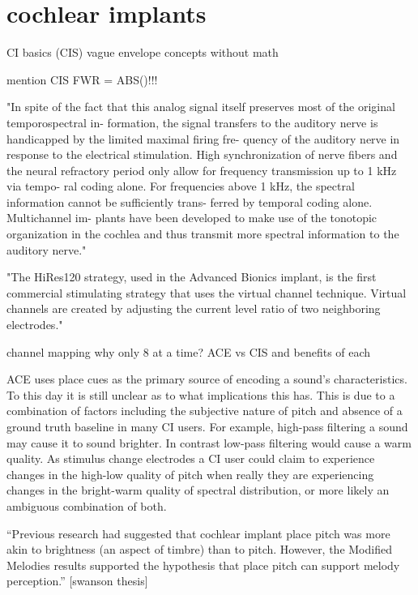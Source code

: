 \documentclass [11pt, proquest] {uwthesis}[2015/03/03]
\begin{document}
\section{cochlear implants}
CI basics (CIS)
vague envelope concepts without math

mention CIS FWR = ABS()!!!

"In spite of the fact that this analog signal itself preserves most of the original temporospectral in- formation, the signal transfers to the auditory nerve is handicapped by the limited maximal firing fre- quency of the auditory nerve in response to the electrical stimulation. High synchronization of nerve fibers and the neural refractory period only allow for frequency transmission up to 1 kHz via tempo- ral coding alone. For frequencies above 1 kHz, the spectral information cannot be sufficiently trans- ferred by temporal coding alone. Multichannel im- plants have been developed to make use of the tonotopic organization in the cochlea and thus transmit more spectral information to the auditory nerve." \cite{somek2006coding}


"The HiRes120 strategy, used in the Advanced Bionics implant, is the first commercial stimulating strategy that uses the virtual channel technique. Virtual channels are created by adjusting the current level ratio of two neighboring electrodes."

channel mapping
    why only 8 at a time?
    ACE vs CIS and benefits of each
    
    
    
    ACE uses place cues as the primary source of encoding a sound's characteristics.  To this day it is still unclear as to what implications this has.  This is due to a combination of factors including the subjective nature of pitch and absence of a ground truth baseline in many CI users.  For example, high-pass filtering a sound may cause it to sound brighter.  In contrast low-pass filtering would cause a warm quality.  As stimulus change electrodes a CI user could claim to experience changes in the high-low quality of pitch when really they are experiencing changes in the bright-warm quality of spectral distribution, or more likely an ambiguous combination of both.

``Previous research had suggested that cochlear implant place pitch was more akin to brightness (an aspect of timbre) than to pitch. However, the Modified Melodies results supported the hypothesis that place pitch can support melody perception.'' [swanson thesis]
\end{document}
